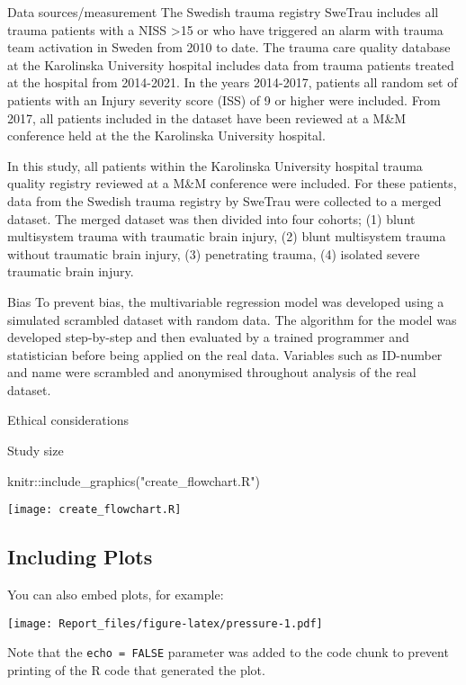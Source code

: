 \documentclass[
]{article}
\newenvironment{Shaded}{\begin{snugshade}}{\end{snugshade}}
\newcommand{\FunctionTok}[1]{\textcolor[rgb]{0.00,0.00,0.00}{#1}}
\newcommand{\NormalTok}[1]{#1}
\newcommand{\SpecialCharTok}[1]{\textcolor[rgb]{0.00,0.00,0.00}{#1}}
\newcommand{\StringTok}[1]{\textcolor[rgb]{0.31,0.60,0.02}{#1}}
\begin{document}
Data sources/measurement The Swedish trauma registry SweTrau includes
all trauma patients with a NISS \textgreater15 or who have triggered an
alarm with trauma team activation in Sweden from 2010 to date. The
trauma care quality database at the Karolinska University hospital
includes data from trauma patients treated at the hospital from
2014-2021. In the years 2014-2017, patients all random set of patients
with an Injury severity score (ISS) of 9 or higher were included. From
2017, all patients included in the dataset have been reviewed at a M\&M
conference held at the the Karolinska University hospital.

In this study, all patients within the Karolinska University hospital
trauma quality registry reviewed at a M\&M conference were included. For
these patients, data from the Swedish trauma registry by SweTrau were
collected to a merged dataset. The merged dataset was then divided into
four cohorts; (1) blunt multisystem trauma with traumatic brain injury,
(2) blunt multisystem trauma without traumatic brain injury, (3)
penetrating trauma, (4) isolated severe traumatic brain injury.

Bias To prevent bias, the multivariable regression model was developed
using a simulated scrambled dataset with random data. The algorithm for
the model was developed step-by-step and then evaluated by a trained
programmer and statistician before being applied on the real data.
Variables such as ID-number and name were scrambled and anonymised
throughout analysis of the real dataset.

Ethical considerations

Study size

\begin{Shaded}
\begin{Highlighting}[]
\NormalTok{knitr}\SpecialCharTok{::}\FunctionTok{include\_graphics}\NormalTok{(}\StringTok{"create\_flowchart.R"}\NormalTok{)}
\end{Highlighting}
\end{Shaded}

\texttt{[image: create\_flowchart.R]}

\hypertarget{including-plots}{%
\subsection{Including Plots}\label{including-plots}}

You can also embed plots, for example:

\texttt{[image: Report\_files/figure-latex/pressure-1.pdf]}

Note that the \texttt{echo\ =\ FALSE} parameter was added to the code
chunk to prevent printing of the R code that generated the plot.
\end{document}
